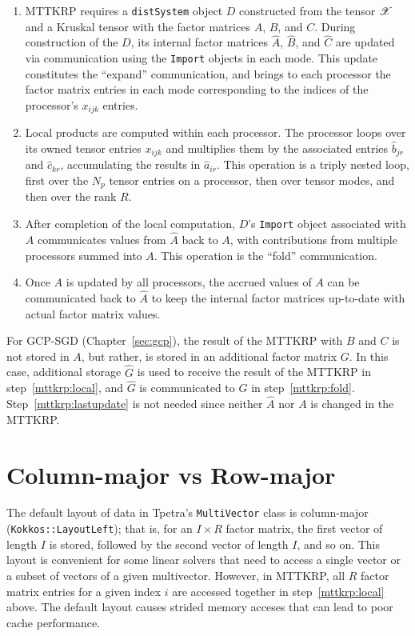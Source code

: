 \begin{enumerate}
\item MTTKRP requires a {\tt distSystem} object $D$ constructed from the tensor
$\X$ and a Kruskal tensor with the factor matrices $A$, $B$, and $C$.  
During construction of the $D$, its internal factor matrices $\hat A$, 
$\hat B$, and $\hat C$ are updated 
via communication using the {\tt Import} objects in each mode.
This update constitutes the ``expand'' communication, and brings to each 
processor the factor matrix entries in each mode corresponding to the 
indices of the processor's $x_{ijk}$ entries.

\item \label{mttkrp:local} Local products are computed within each processor.  The processor loops
over its owned tensor entries $x_{ijk}$ and multiplies them by the associated
entries $\hat b_{jr}$ and $\hat c_{kr}$, accumulating the results in 
$\hat a_{ir}$.  This operation is a triply nested loop, first over the 
$N_p$ tensor entries on a processor, 
then over tensor modes, and then over the rank $R$.

\item \label{mttkrp:fold} After completion of the local computation, $D$'s {\tt Import} object 
associated with $A$ communicates values from $\hat A$ 
back to $A$, with contributions from multiple 
processors summed into $A$.  This operation is the ``fold'' communication.

\item \label{mttkrp:lastupdate} Once $A$ is updated by all processors, 
the accrued values of $A$ can be communicated back to $\hat A$ to keep the 
internal factor matrices up-to-date with actual factor matrix values.
\end{enumerate}

For GCP-SGD (Chapter~\ref{sec:gcp}), 
the result of the MTTKRP with $B$ and $C$ is not stored in 
$A$, but rather, is stored in an additional factor matrix $G$.  In this case,
additional storage $\hat G$ is used to receive the result of the MTTKRP in
step~\ref{mttkrp:local}, and $\hat G$ is communicated to $G$ in 
step~\ref{mttkrp:fold}.  Step~\ref{mttkrp:lastupdate} is not needed since
neither $\hat A$ nor $A$ is changed in the MTTKRP.

\section{Column-major vs Row-major}

The default layout of data in Tpetra's {\tt MultiVector} class
is column-major ({\tt Kokkos::LayoutLeft}); that is, for an $I \times R$ factor 
matrix, the first vector of length $I$ is stored, followed by the second
vector of length $I$, and so on.  This layout is convenient for some linear
solvers that need to access a single vector or a subset of vectors of a 
given multivector.
However, in MTTKRP, all $R$ factor matrix
entries for a given index $i$ are accessed together in step~\ref{mttkrp:local} 
above.  The default layout causes strided memory acceses that can lead to 
poor cache performance.

